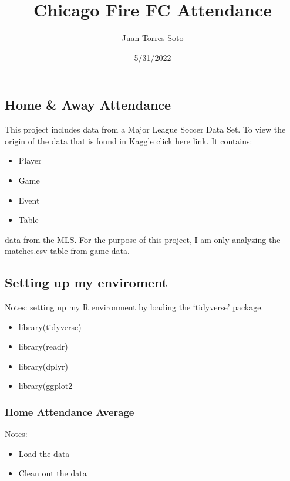 \documentclass[
]{article}
\title{Chicago Fire FC Attendance}
\author{Juan Torres Soto}
\date{5/31/2022}
\providecommand{\tightlist}{%
  \setlength{\itemsep}{0pt}\setlength{\parskip}{0pt}}
\begin{document}
\maketitle

\hypertarget{home-away-attendance}{%
\subsection{Home \& Away Attendance}\label{home-away-attendance}}

This project includes data from a Major League Soccer Data Set. To view
the origin of the data that is found in Kaggle click here
\href{https://www.kaggle.com/datasets/josephvm/major-league-soccer-dataset}{link}.
It contains:

\begin{itemize}
\tightlist
\item
  Player
\item
  Game
\item
  Event
\item
  Table
\end{itemize}

data from the MLS. For the purpose of this project, I am only analyzing
the matches.csv table from game data.

\hypertarget{setting-up-my-enviroment}{%
\subsection{Setting up my enviroment}\label{setting-up-my-enviroment}}

Notes: setting up my R environment by loading the `tidyverse' package.

\begin{itemize}
\tightlist
\item
  library(tidyverse)
\item
  library(readr)
\item
  library(dplyr)
\item
  library(ggplot2
\end{itemize}

\hypertarget{home-attendance-average}{%
\subsubsection{Home Attendance Average}\label{home-attendance-average}}

Notes:

\begin{itemize}
\tightlist
\item
  Load the data
\item
  Clean out the data
\end{itemize}
\end{document}
